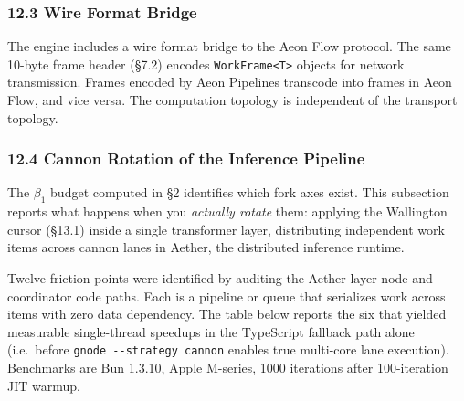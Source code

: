 \documentclass[
  11pt,
]{article}
\begin{document}
\subsubsection{12.3 Wire Format Bridge}\label{wire-format-bridge}

The engine includes a wire format bridge to the Aeon Flow protocol. The
same 10-byte frame header (§7.2) encodes
\texttt{WorkFrame\textless{}T\textgreater{}} objects for network
transmission. Frames encoded by Aeon Pipelines transcode into frames in
Aeon Flow, and vice versa. The computation topology is independent of
the transport topology.

\subsubsection{12.4 Cannon Rotation of the Inference Pipeline}\label{cannon-rotation-inference}

The \(\beta_1\) budget computed in §2 identifies which fork axes exist.  This subsection reports what happens when you \emph{actually rotate} them: applying the Wallington cursor (§13.1) inside a single transformer layer, distributing independent work items across cannon lanes in Aether, the distributed inference runtime.

Twelve friction points were identified by auditing the Aether layer-node and coordinator code paths.  Each is a pipeline or queue that serializes work across items with zero data dependency.  The table below reports the six that yielded measurable single-thread speedups in the TypeScript fallback path alone (i.e.\ before \texttt{gnode -{}-strategy cannon} enables true multi-core lane execution).  Benchmarks are Bun 1.3.10, Apple M-series, 1000 iterations after 100-iteration JIT warmup.
\end{document}
